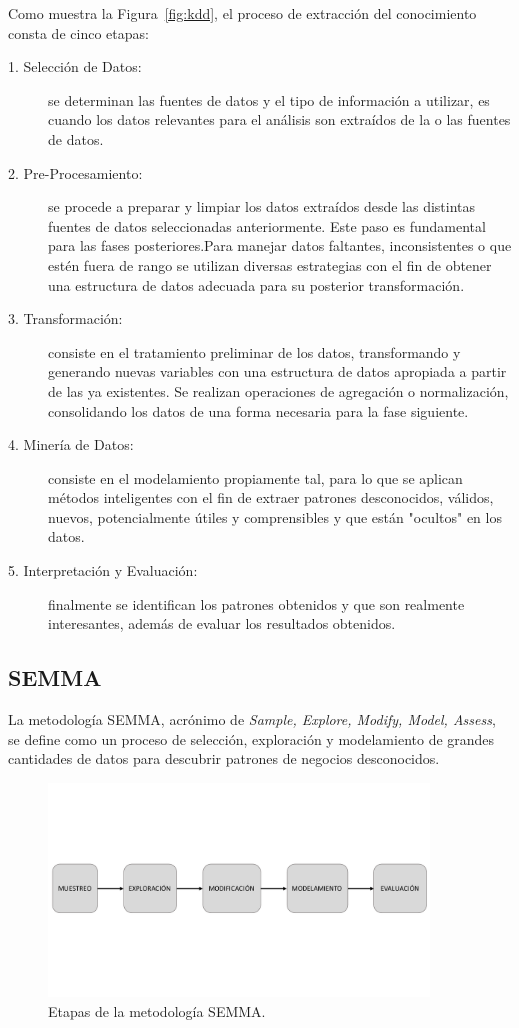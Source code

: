 Como muestra la Figura~\ref{fig:kdd}, el proceso de extracción del conocimiento consta de cinco etapas:
\begin{description}
  \item[1. Selección de Datos:] se determinan las fuentes de datos y el tipo de información a utilizar, es cuando los datos relevantes para el análisis son extraídos de la o las fuentes de datos.
  \item[2. Pre-Procesamiento:] se procede a preparar y limpiar los datos extraídos desde las distintas fuentes de datos seleccionadas anteriormente. Este paso es fundamental para las fases posteriores.Para manejar datos faltantes, inconsistentes o que estén fuera de rango se utilizan diversas estrategias con el fin de obtener una estructura de datos adecuada para su posterior transformación.
  \item[3. Transformación:] consiste en el tratamiento preliminar de los datos, transformando y generando nuevas variables con una estructura de datos apropiada a partir de las ya existentes. Se realizan operaciones de agregación o normalización, consolidando los datos de una forma necesaria para la fase siguiente. 
  \item[4. Minería de Datos:] consiste en el modelamiento propiamente tal, para lo que se aplican métodos inteligentes con el fin de extraer patrones desconocidos, válidos, nuevos, potencialmente útiles y comprensibles y que están "ocultos" en los datos.
  \item[5. Interpretación y Evaluación:] finalmente se identifican los patrones obtenidos y que son realmente interesantes, además de evaluar los resultados obtenidos.
\end{description}

\subsection{SEMMA}
La metodología SEMMA, acrónimo de \textit{Sample, Explore, Modify, Model, Assess}, se define como un proceso de selección, exploración y modelamiento de grandes cantidades de datos para descubrir patrones de negocios desconocidos. 

\begin{figure}[H]
  \centering
    \includegraphics[width=0.9\textwidth]{Figuras/SEMMA}
      \caption{Etapas de la metodología SEMMA.}
    \label{fig:semma}
\end{figure}

